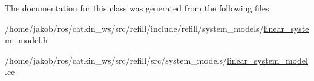 The documentation for this class was generated from the following files\+:\begin{DoxyCompactItemize}
\item 
/home/jakob/ros/catkin\+\_\+ws/src/refill/include/refill/system\+\_\+models/\hyperlink{linear__system__model_8h}{linear\+\_\+system\+\_\+model.\+h}\item 
/home/jakob/ros/catkin\+\_\+ws/src/refill/src/system\+\_\+models/\hyperlink{linear__system__model_8cc}{linear\+\_\+system\+\_\+model.\+cc}\end{DoxyCompactItemize}
